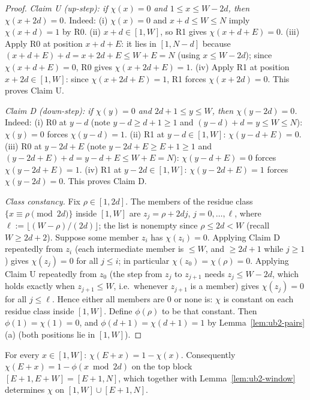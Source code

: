 \begin{proof}
\emph{Claim U (up-step): if $\chi(x) = 0$ and $1 \le x \le W - 2d$, then
$\chi(x + 2d) = 0$.} Indeed: (i) $\chi(x) = 0$ and $x + d \le W \le N$
imply $\chi(x + d) = 1$ by R0. (ii) $x + d \in [1, W]$, so R1 gives
$\chi(x + d + E) = 0$. (iii) Apply R0 at position $x + d + E$: it lies in
$[1, N-d]$ because $(x + d + E) + d = x + 2d + E \le W + E = N$ (using
$x \le W - 2d$); since $\chi(x + d + E) = 0$, R0 gives
$\chi(x + 2d + E) = 1$. (iv) Apply R1 at position $x + 2d \in [1, W]$:
since $\chi(x + 2d + E) = 1$, R1 forces $\chi(x + 2d) = 0$. This proves
Claim U.

\emph{Claim D (down-step): if $\chi(y) = 0$ and $2d + 1 \le y \le W$, then
$\chi(y - 2d) = 0$.} Indeed: (i) R0 at $y - d$ (note $y - d \ge d + 1 \ge 1$
and $(y - d) + d = y \le W \le N$): $\chi(y) = 0$ forces $\chi(y - d) = 1$.
(ii) R1 at $y - d \in [1, W]$: $\chi(y - d + E) = 0$. (iii) R0 at
$y - 2d + E$ (note $y - 2d + E \ge E + 1 \ge 1$ and
$(y - 2d + E) + d = y - d + E \le W + E = N$): $\chi(y - d + E) = 0$ forces
$\chi(y - 2d + E) = 1$. (iv) R1 at $y - 2d \in [1, W]$:
$\chi(y - 2d + E) = 1$ forces $\chi(y - 2d) = 0$. This proves Claim D.

\emph{Class constancy.} Fix $\rho \in [1, 2d]$. The members of the residue
class $\{x \equiv \rho \pmod{2d}\}$ inside $[1, W]$ are
$z_j = \rho + 2dj$, $j = 0, \dots, \ell$, where
$\ell := \lfloor (W - \rho)/(2d) \rfloor$; the list is nonempty since
$\rho \le 2d < W$ (recall $W \ge 2d + 2$). Suppose some member $z_i$ has
$\chi(z_i) = 0$. Applying Claim D repeatedly from $z_i$ (each intermediate
member is $\le W$, and $\ge 2d + 1$ while $j \ge 1$) gives $\chi(z_j) = 0$
for all $j \le i$; in particular $\chi(z_0) = \chi(\rho) = 0$. Applying
Claim U repeatedly from $z_0$ (the step from $z_j$ to $z_{j+1}$ needs
$z_j \le W - 2d$, which holds exactly when $z_{j+1} \le W$, i.e.\ whenever
$z_{j+1}$ is a member) gives $\chi(z_j) = 0$ for all $j \le \ell$. Hence
either all members are $0$ or none is: $\chi$ is constant on each residue
class inside $[1, W]$. Define $\phi(\rho)$ to be that constant. Then
$\phi(1) = \chi(1) = 0$, and $\phi(d+1) = \chi(d+1) = 1$ by
Lemma~\ref{lem:ub2-pairs}(a) (both positions lie in $[1, W]$).
\end{proof}

\begin{lemma}\label{lem:ub2-flip}
For every $x \in [1, W]$: $\chi(E + x) = 1 - \chi(x)$. Consequently
$\chi(E + x) = 1 - \phi(x \bmod 2d)$ on the top block
$[E+1, E+W] = [E+1, N]$, which together with
Lemma~\ref{lem:ub2-window} determines $\chi$ on $[1, W] \cup [E+1, N]$.
\end{lemma}

